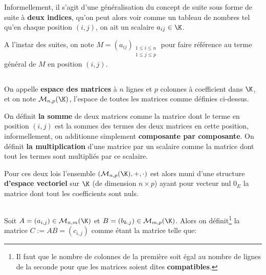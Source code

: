Informellement, il s'agit d'une généralisation du concept de suite sous forme de suite à \textbf{deux indices}, qu'on peut alors voir comme un tableau de nombres tel qu'en chaque position \((i, j)\), on ait un scalaire \(a_{ij} \in \K\).\< 

A l'instar des suites, on note \(M = (a_{ij})_{\substack{1 \leq i \leq n\\1 \leq j \leq p}}\) pour faire référence au terme général de \(M\) en position \((i,j)\).

\subsection*{}

On appelle \textbf{espace des matrices} à \(n\) lignes et \(p\) colonnes à coefficient dans \(\K\), et on note \(\mathcal{M}_{n, p}(\K)\), l'espace de toutes les matrices comme définies ci-dessus.\<

On définit \textbf{la somme} de deux matrices comme la matrice dont le terme en position \((i, j)\) est la sommes des termes des deux matrices en cette position, informellement, on additionne simplement \textbf{composante par composante}.\+
On définit \textbf{la multiplication} d'une matrice par un scalaire comme la matrice dont tout les termes sont multipliés par ce scalaire.\<

Pour ces deux lois l'ensemble \((\mathcal{M}_{n, p}(\K), +, \cdot)\) est alors muni d'une structure \textbf{d'espace vectoriel} sur \(\K\) (de dimension \(n \times p\)) ayant pour vecteur nul \(0_E\) la matrice dont tout les coefficients sont nuls.

\subsection*{}

Soit \(A = (a_{i, j}) \in \mathcal{M}_{n, m}(\K)\) et \(B = (b_{k, j}) \in \mathcal{M}_{m, p}(\K)\).\+
Alors on définit\footnote[1]{Il faut que le nombre de colonnes de la première soit égal au nombre de lignes de la seconde pour que les matrices soient dites \textbf{compatibles}.}  la matrice \(C := AB = (c_{i,j})\) comme étant la matrice telle que:

